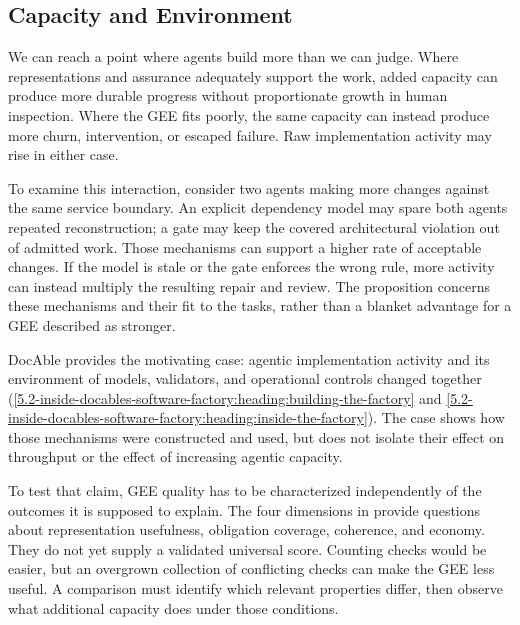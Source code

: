 \subsection{Capacity and Environment}\label{heading:capacity-and-environment}

We can reach a point where agents build more than we can judge. Where representations and assurance adequately support the work, added capacity can produce more durable progress without proportionate growth in human inspection. Where the GEE fits poorly, the same capacity can instead produce more churn, intervention, or escaped failure. Raw implementation activity may rise in either case.


To examine this interaction, consider two agents making more changes against the same service boundary. An explicit dependency model may spare both agents repeated reconstruction; a gate may keep the covered architectural violation out of admitted work. Those mechanisms can support a higher rate of acceptable changes. If the model is stale or the gate enforces the wrong rule, more activity can instead multiply the resulting repair and review. The proposition concerns these mechanisms and their fit to the tasks, rather than a blanket advantage for a GEE described as stronger.

DocAble provides the motivating case: agentic implementation activity and its environment of models, validators, and operational controls changed together (\autoref{5.2-inside-docables-software-factory:heading:building-the-factory} and \autoref{5.2-inside-docables-software-factory:heading:inside-the-factory}). The case shows how those mechanisms were constructed and used, but does not isolate their effect on throughput or the effect of increasing agentic capacity.


To test that claim, GEE quality has to be characterized independently of the outcomes it is supposed to explain. The four dimensions in  provide questions about representation usefulness, obligation coverage, coherence, and economy. They do not yet supply a validated universal score. Counting checks would be easier, but an overgrown collection of conflicting checks can make the GEE less useful. A comparison must identify which relevant properties differ, then observe what additional capacity does under those conditions.

